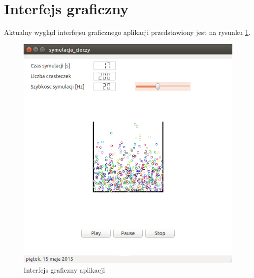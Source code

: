 \section{Interfejs graficzny}
Aktualny wygląd interfejsu graficznego aplikacji przedstawiony jest na rysunku \ref{fig:gui}.

\begin{figure}[H]
 \begin{center} 
  \includegraphics[width=\textwidth] {rysunki/gui.png} 
 \end{center}
 \caption{Interfejs graficzny aplikacji}
 \label{fig:gui} 
\end{figure} 
